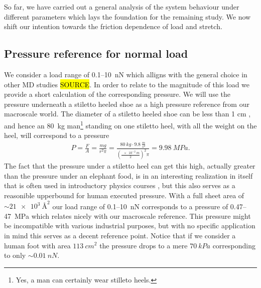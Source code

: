 So far, we have carried out a general analysis of the system behaviour under
different parameters which lays the foundation for the remaining study. We now
shift our intention towards the friction dependence of load and stretch.

\subsection{Pressure reference for normal load}

We consider a load range of 0.1--\SI{10}{nN} which alligns with the general choice in other \acrshort{MD} studies \hl{SOURCE}. In order to relate to the magnitude of this load we provide a short calculation of the corresponding pressure. We will use the pressure underneath a stiletto heeled shoe as a high pressure reference from our macroscale world. The diameter of a stiletto heeled
shoe can be less than 1 cm \cite{stiletto_1}, and hence an \SI{80}{kg} man\footnote{Yes, a man can certainly
wear stilleto heels.} standing on one stiletto heel, with all the weight on the heel, will correspond to a pressure
\begin{align*}
  P = \frac{F}{A} = \frac{mg}{r^2\pi} = \frac{\SI{80}{kg} \cdot \SI{9.8}{\frac{m}{s^2}}}{(\frac{\SI{e-2}{m}}{2})^2 \pi} = \SI{9.98}{MPa}.
\end{align*} 
The fact that the pressure under a stiletto heel can get this high, actually greater than the pressure under an elephant food, is in an interesting realization in itself that is often used in
introductory physics courses \cite{stiletto_2}, but this also serves as a reasonible upperbound for human executed pressure. With
a full sheet area of $\sim\SI{21e3}{{\text{Å}}^2}$ our load range of 0.1--\SI{10}{nN} corresponds to a pressure of 0.47--\SI{47}{MPa} which relates nicely with our macroscale reference. This pressure might be incompatible with various industrial purposes, but with no specific application in mind this serves as a decent reference point. Notice that if we consider a human foot with area $\SI{113}{cm^2}$ \cite{stiletto_3} the pressure
drops to a mere $\SI{70}{kPa}$ corresponding to only $\sim \SI{0.01}{nN}$.





